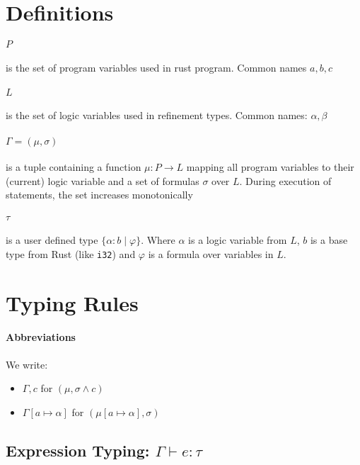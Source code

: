 \documentclass{article}
\begin{document}
  

\section{Definitions}

\paragraph*{$P$} is the set of program variables used in rust program. Common names $a, b, c$
\paragraph*{$L$} is the set of logic variables used in refinement types. Common names: $\alpha, \beta$

\paragraph*{$\Gamma = (\mu, \sigma)$} is a tuple containing a function $\mu: P \to L$ mapping all program variables to their (current) logic variable and a set of formulas $\sigma$ over $L$. During execution of statements, the set increases monotonically

\paragraph*{$\tau$} is a user defined type $\{ \alpha : b \mid \varphi\}$. Where $\alpha$ is a logic variable from $L$, $b$ is a base type from Rust (like \texttt{i32}) and $\varphi$ is a formula over variables in $L$.

\section{Typing Rules}

\paragraph*{Abbreviations}
We write:
\begin{itemize}
  \item  $\Gamma, c$ for $(\mu, \sigma \wedge c)$
  \item $\Gamma[a \mapsto \alpha]$ for $(\mu[a \mapsto \alpha], \sigma)$
\end{itemize}


\subsection{Expression Typing: $\Gamma \vdash e : \tau$}
\end{document}
